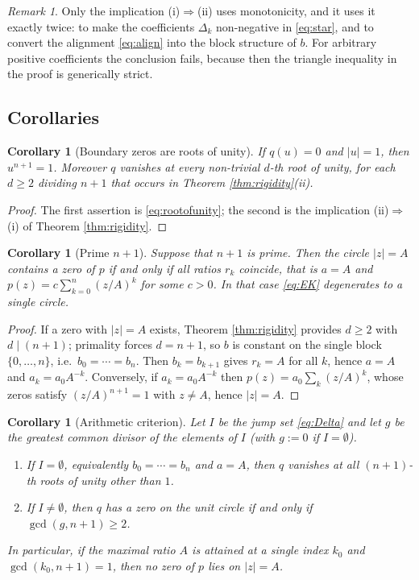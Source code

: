 \documentclass[11pt]{amsart}
\theoremstyle{plain}
\newtheorem{corollary}[theorem]{Corollary}
\theoremstyle{definition}
\theoremstyle{remark}
\newtheorem{remark}[theorem]{Remark}
\newcommand{\abs}[1]{\lvert #1\rvert}
\newcommand{\set}[1]{\{#1\}}
\begin{document}
\begin{remark}
Only the implication (i)$\Rightarrow$(ii) uses monotonicity, and it uses it exactly twice:
to make the coefficients $\Delta_k$ non-negative in \eqref{eq:star}, and to convert the
alignment \eqref{eq:align} into the block structure of $b$. For arbitrary positive
coefficients the conclusion fails, because then the triangle inequality in the proof is
generically strict.
\end{remark}

\subsection{Corollaries}\label{sec:corollaries}

\begin{corollary}[Boundary zeros are roots of unity]\label{cor:rootofunity}
If $q(u)=0$ and $\abs{u}=1$, then $u^{n+1}=1$. Moreover $q$ vanishes at every non-trivial
$d$-th root of unity, for each $d\ge2$ dividing $n+1$ that occurs in
Theorem \ref{thm:rigidity}(ii).
\end{corollary}

\begin{proof}
The first assertion is \eqref{eq:rootofunity}; the second is the implication
(ii)$\Rightarrow$(i) of Theorem \ref{thm:rigidity}.
\end{proof}

\begin{corollary}[Prime $n+1$]\label{cor:prime}
Suppose that $n+1$ is prime. Then the circle $\abs{z}=A$ contains a zero of $p$ if and only
if all ratios $r_k$ coincide, that is $a=A$ and $p(z)=c\sum_{k=0}^{n}(z/A)^{k}$ for some
$c>0$. In that case \eqref{eq:EK} degenerates to a single circle.
\end{corollary}

\begin{proof}
If a zero with $\abs{z}=A$ exists, Theorem \ref{thm:rigidity} provides $d\ge2$ with
$d\mid(n+1)$; primality forces $d=n+1$, so $b$ is constant on the single block
$\set{0,\dots,n}$, i.e.\ $b_0=\cdots=b_n$. Then $b_k=b_{k+1}$ gives $r_k=A$ for all $k$,
hence $a=A$ and $a_k=a_0A^{-k}$. Conversely, if $a_k=a_0A^{-k}$ then
$p(z)=a_0\sum_k(z/A)^{k}$, whose zeros satisfy $(z/A)^{n+1}=1$ with $z\ne A$, hence
$\abs{z}=A$.
\end{proof}

\begin{corollary}[Arithmetic criterion]\label{cor:gcd}
Let $I$ be the jump set \eqref{eq:Delta} and let $g$ be the greatest common divisor of the
elements of $I$ (with $g:=0$ if $I=\emptyset$).
\begin{enumerate}
\item[(a)] If $I=\emptyset$, equivalently $b_0=\cdots=b_n$ and $a=A$, then $q$ vanishes at
all $(n+1)$-th roots of unity other than $1$.
\item[(b)] If $I\ne\emptyset$, then $q$ has a zero on the unit circle if and only if
$\gcd(g,n+1)\ge2$.
\end{enumerate}
In particular, if the maximal ratio $A$ is attained at a single index $k_0$ and
$\gcd(k_0,n+1)=1$, then no zero of $p$ lies on $\abs{z}=A$.
\end{corollary}
\end{document}
